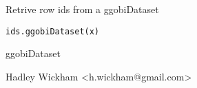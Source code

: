 \begin{Description}\relax
Retrive row ids from a ggobiDataset
\end{Description}
\begin{Usage}
\begin{verbatim}ids.ggobiDataset(x)\end{verbatim}
\end{Usage}
\begin{Arguments}
\begin{ldescription}
\item[\code{x}] ggobiDataset
\end{ldescription}
\end{Arguments}
\begin{Details}\relax
\end{Details}
\begin{Author}\relax
Hadley Wickham <h.wickham@gmail.com>
\end{Author}
\begin{SeeAlso}\relax
{}
\end{SeeAlso}
\begin{Examples}
\begin{ExampleCode}\end{ExampleCode}
\end{Examples}

